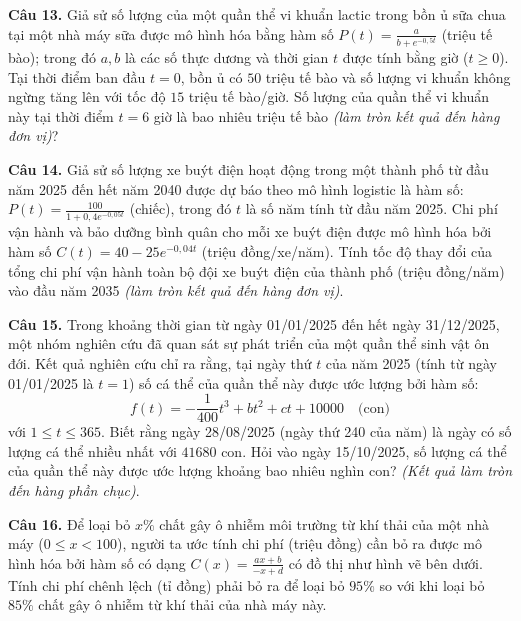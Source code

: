 \documentclass[12pt]{article}
\begin{document}
	
	\noindent \textbf{Câu 13.} Giả sử số lượng của một quần thể vi khuẩn lactic trong bồn ủ sữa chua tại một nhà máy sữa được mô hình hóa bằng hàm số $P(t) = \frac{a}{b + e^{-0,5t}}$ (triệu tế bào); trong đó $a, b$ là các số thực dương và thời gian $t$ được tính bằng giờ ($t \ge 0$). Tại thời điểm ban đầu $t = 0$, bồn ủ có $50$ triệu tế bào và số lượng vi khuẩn không ngừng tăng lên với tốc độ $15$ triệu tế bào/giờ. Số lượng của quần thể vi khuẩn này tại thời điểm $t = 6$ giờ là bao nhiêu triệu tế bào \textit{(làm tròn kết quả đến hàng đơn vị)}?
	
	\vspace{0.6cm}
	
	\noindent \textbf{Câu 14.} Giả sử số lượng xe buýt điện hoạt động trong một thành phố từ đầu năm 2025 đến hết năm 2040 được dự báo theo mô hình logistic là hàm số: $P(t) = \frac{100}{1 + 0,4e^{-0,05t}}$ (chiếc), trong đó $t$ là số năm tính từ đầu năm 2025. Chi phí vận hành và bảo dưỡng bình quân cho mỗi xe buýt điện được mô hình hóa bởi hàm số $C(t) = 40 - 25e^{-0,04t}$ (triệu đồng/xe/năm). Tính tốc độ thay đổi của tổng chi phí vận hành toàn bộ đội xe buýt điện của thành phố (triệu đồng/năm) vào đầu năm 2035 \textit{(làm tròn kết quả đến hàng đơn vị)}.
	
	\vspace{0.6cm}
	\noindent \textbf{Câu 15.} Trong khoảng thời gian từ ngày 01/01/2025 đến hết ngày 31/12/2025, một nhóm nghiên cứu đã quan sát sự phát triển của một quần thể sinh vật ôn đới. Kết quả nghiên cứu chỉ ra rằng, tại ngày thứ $t$ của năm 2025 (tính từ ngày 01/01/2025 là $t = 1$) số cá thể của quần thể này được ước lượng bởi hàm số:
	$$f(t) = -\frac{1}{400}t^3 + bt^2 + ct + 10000 \quad \text{(con)}$$
	với $1 \le t \le 365$. Biết rằng ngày 28/08/2025 (ngày thứ 240 của năm) là ngày có số lượng cá thể nhiều nhất với $41680$ con. Hỏi vào ngày 15/10/2025, số lượng cá thể của quần thể này được ước lượng khoảng bao nhiêu nghìn con? \textit{(Kết quả làm tròn đến hàng phần chục)}.
	
	\vspace{0.6cm}
	
	\noindent \textbf{Câu 16.} Để loại bỏ $x\%$ chất gây ô nhiễm môi trường từ khí thải của một nhà máy ($0 \le x < 100$), người ta ước tính chi phí (triệu đồng) cần bỏ ra được mô hình hóa bởi hàm số có dạng $C(x) = \frac{ax+b}{-x+d}$ có đồ thị như hình vẽ bên dưới. Tính chi phí chênh lệch (tỉ đồng) phải bỏ ra để loại bỏ $95\%$ so với khi loại bỏ $85\%$ chất gây ô nhiễm từ khí thải của nhà máy này.
	
\end{document}
